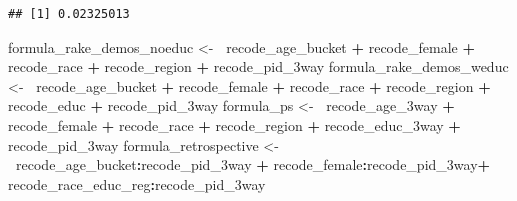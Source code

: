 \documentclass[]{article}
\newenvironment{Shaded}{\begin{snugshade}}{\end{snugshade}}
\newcommand{\ErrorTok}[1]{\textcolor[rgb]{0.64,0.00,0.00}{\textbf{#1}}}
\newcommand{\NormalTok}[1]{#1}
\newcommand{\OperatorTok}[1]{\textcolor[rgb]{0.81,0.36,0.00}{\textbf{#1}}}
\newcommand{\StringTok}[1]{\textcolor[rgb]{0.31,0.60,0.02}{#1}}
\begin{document}
\begin{verbatim}
## [1] 0.02325013
\end{verbatim}

\begin{Shaded}
\begin{Highlighting}[]
\NormalTok{formula_rake_demos_noeduc <-}\StringTok{ }\ErrorTok{~}\NormalTok{recode_age_bucket }\OperatorTok{+}\StringTok{ }\NormalTok{recode_female }\OperatorTok{+}\StringTok{ }
\StringTok{    }\NormalTok{recode_race }\OperatorTok{+}\StringTok{ }\NormalTok{recode_region }\OperatorTok{+}\StringTok{ }\NormalTok{recode_pid_3way}
\NormalTok{formula_rake_demos_weduc <-}\StringTok{ }\ErrorTok{~}\NormalTok{recode_age_bucket }\OperatorTok{+}\StringTok{ }\NormalTok{recode_female }\OperatorTok{+}\StringTok{ }
\StringTok{  }\NormalTok{recode_race }\OperatorTok{+}\StringTok{ }\NormalTok{recode_region }\OperatorTok{+}\StringTok{ }\NormalTok{recode_educ }\OperatorTok{+}\StringTok{ }\NormalTok{recode_pid_3way}
\NormalTok{formula_ps <-}\StringTok{ }\ErrorTok{~}\NormalTok{recode_age_3way }\OperatorTok{+}\StringTok{ }\NormalTok{recode_female }\OperatorTok{+}\StringTok{ }\NormalTok{recode_race }\OperatorTok{+}
\StringTok{    }\NormalTok{recode_region }\OperatorTok{+}\StringTok{ }\NormalTok{recode_educ_3way }\OperatorTok{+}\StringTok{ }\NormalTok{recode_pid_3way}
\NormalTok{formula_retrospective <-}\StringTok{ }\ErrorTok{~}\NormalTok{recode_age_bucket}\OperatorTok{:}\NormalTok{recode_pid_3way }\OperatorTok{+}\StringTok{ }
\StringTok{  }\NormalTok{recode_female}\OperatorTok{:}\NormalTok{recode_pid_3way}\OperatorTok{+}
\StringTok{    }\NormalTok{recode_race_educ_reg}\OperatorTok{:}\NormalTok{recode_pid_3way}
\end{Highlighting}
\end{Shaded}
\end{document}
